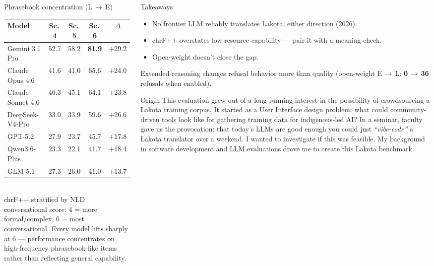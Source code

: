 \documentclass[final]{beamer}
\begin{document}
\begin{frame}[t]
\begin{columns}[t]
\begin{column}{0.64\paperwidth}
\begin{columns}[t]
\begin{column}{0.49\textwidth}
\begin{block}{Phrasebook concentration (L\,$\rightarrow$\,E)}
\centering\small
\begin{tabular}{@{}lcccc@{}}
\toprule
\textbf{Model} & \textbf{Sc.\,4} & \textbf{Sc.\,5} & \textbf{Sc.\,6} & \textbf{$\Delta$} \\
\midrule
Gemini 3.1 Pro & 52.7 & 58.2 & \textbf{81.9} & +29.2 \\
Claude Opus 4.6 & 41.6 & 41.0 & 65.6 & +24.0 \\
Claude Sonnet 4.6 & 40.3 & 45.1 & 64.1 & +23.8 \\
DeepSeek-V4-Pro & 33.0 & 33.9 & 59.6 & +26.6 \\
GPT-5.2 & 27.9 & 23.7 & 45.7 & +17.8 \\
Qwen3.6-Plus & 23.3 & 22.1 & 41.7 & +18.4 \\
GLM-5.1 & 27.3 & 26.0 & 41.0 & +13.7 \\
\bottomrule
\end{tabular}
\\[8pt]
{\footnotesize chrF++ stratified by NLD conversational score: 4 = more formal/complex, 6 = most conversational. Every model lifts sharply at 6 --- performance concentrates on high-frequency phrasebook-like items rather than reflecting general capability.}
\end{block}
\end{column}
\begin{column}{0.49\textwidth}
\begin{block}{Takeaways}
\begin{itemize}
\item No frontier LLM reliably translates Lakota, either direction (2026).
\item chrF++ overstates low-resource capability --- pair it with a meaning check.
\item Open-weight doesn't close the gap.
\end{itemize}
\smallskip
Extended reasoning changes refusal behavior more than quality (open-weight E\,$\rightarrow$\,L: \textbf{0\,$\rightarrow$\,36} refusals when enabled).
\end{block}

\begin{block}{Origin}
{\small This evaluation grew out of a long-running interest in the possibility of crowdsourcing a Lakota training corpus. It started as a User Interface design problem: what could community-driven tools look like for gathering training data for indigenous-led AI? In a seminar, faculty gave us the provocation: that today's LLMs are good enough you could just \emph{``vibe-code''} a Lakota translator over a weekend. I wanted to investigate if this was feasible. My background in software development and LLM evaluations drove me to create this Lakota benchmark.}
\end{block}


\end{column}
\end{columns}
\end{column}
\end{columns}
\end{frame}
\end{document}
